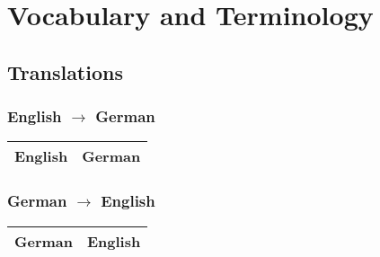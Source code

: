 \documentclass[a4paper, 11pt, accentcolor = tud3b]{tudreport}
\begin{document}
	
	\appendix
	
	\chapter{Vocabulary and Terminology}
		\section{Translations}
			\subsection{English \(\to\) German}
				\begin{table}[H]
					\centering
					\begin{tabular}{l|l}
						\textbf{English} & \textbf{German} \\ \hline
						
					\end{tabular}
				\end{table}
			
			\subsection{German \(\to\) English}
				\begin{table}[H]
					\centering
					\begin{tabular}{l|l}
						\textbf{German} & \textbf{English} \\ \hline
						
					\end{tabular}
				\end{table}
\end{document}
